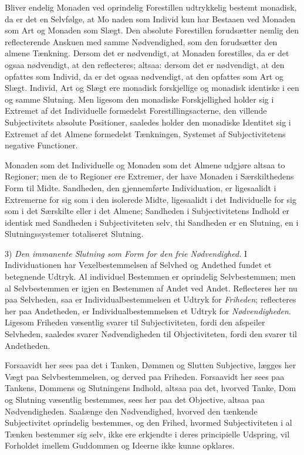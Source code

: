 \documentclass[12pt]{book}
\newcommand{\opage}[1]{\marginnote{\footnotesize\textit{[#1]}}}
\begin{document}
Bliver endelig Monaden ved oprindelig Forestillen udtrykkelig bestemt monadisk, da er det en Selvfølge, at Mo%
\opage{363}naden som Individ kun har Bestaaen ved Monaden som Art og Monaden som Slægt. Den absolute Forestillen forudsætter nemlig den reflecterende Anskuen med samme Nødvendighed, som den forudsætter den almene Tænkning. Dersom det er nødvendigt, at Monaden forestilles, da er det ogsaa nødvendigt, at den reflecteres; altsaa: dersom det er nødvendigt, at den opfattes som Individ, da er det ogsaa nødvendigt, at den opfattes som Art og Slægt. Individ, Art og Slægt ere monadisk forskjellige og monadisk identiske i een og samme Slutning. Men ligesom den monadiske Forskjellighed holder sig i Extremet af det Individuelle formedelst Forestillingsacterne, den villende Subjectivitets absolute Positioner, saaledes holder den monadiske Identitet sig i Extremet af det Almene formedelst Tænkningen, Systemet af Subjectivitetens negative Functioner.

Monaden som det Individuelle og Monaden som det Almene udgjøre altsaa to Regioner; men de to Regioner ere Extremer, der have Monaden i Særskilthedens Form til Midte. Sandheden, den gjennemførte Individuation, er ligesaalidt i Extremerne for sig som i den isolerede Midte, ligesaalidt i det Individuelle for sig som i det Særskilte eller i det Almene; Sandheden i Subjectivitetens Indhold er identisk med Sandheden i Subjectiviteten selv, thi Sandheden er en Slutning, en i Slutningssystemer totaliseret Slutning.

3) \emph{Den immanente Slutning som Form for den frie Nødvendighed.} I Individuationen har Vexelbestemmelsen af Selvhed og Andethed fundet et betegnende Udtryk. Al individuel Bestemmen er oprindelig Selvbestemmen; men al Selvbestemmen er igjen en Bestemmen af Andet ved Andet. Reflecteres her nu paa Selvheden, saa er Individualbestemmelsen et Udtryk for \emph{Friheden}; reflecteres her paa Andetheden, er Individualbestemmelsen et Udtryk for \emph{Nødvendigheden}. Ligesom Friheden væsentlig svarer til Subjectiviteten,
\opage{364}fordi den afspeiler Selvheden, saaledes svarer Nødvendigheden til Objectiviteten, fordi den svarer til Andetheden.

Forsaavidt her sees paa det i Tanken, Dømmen og Slutten Subjective, lægges her Vægt paa Selvbestemmelsen, og derved paa Friheden. Forsaavidt her sees paa Tankens, Dommens og Slutningens Indhold, altsaa paa det, hvorved Tanke, Dom og Slutning væsentlig bestemmes, sees her paa det Objective, altsaa paa Nødvendigheden. Saalænge den Nødvendighed, hvorved den tænkende Subjectivitet oprindelig bestemmes, og den Frihed, hvormed Subjectiviteten i al Tænken bestemmer sig selv, ikke ere erkjendte i deres principielle Udspring, vil Forholdet imellem Guddommen og Ideerne ikke kunne opklares.
\end{document}
